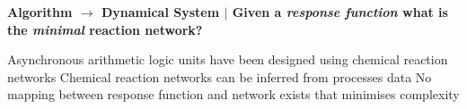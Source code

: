 \documentclass[a0,portrait]{a0poster}
\begin{document}


\vspace{-9cm}
\begin{tcolorbox}[boxrule=2pt,arc=3.4pt,boxsep=2mm]
	\begin{center}
		\textbf{\color{Grey}Algorithm $\rightarrow$ Dynamical System \color{Black}$|$
		Given a \textit{response function} what is the \textit{minimal} reaction network?}
	\end{center}
\end{tcolorbox}

\begin{itemize}[leftmargin=3cm]
	\up Asynchronous arithmetic logic units have been designed using chemical reaction networks \cite{Cardelli2018ChemicalCircuits.}
	\up Chemical reaction networks can be inferred from processes
	data \cite{Galagali2016BayesianNetworks}
	\down No mapping between response function and network exists that minimises complexity
\end{itemize}
\end{document}
